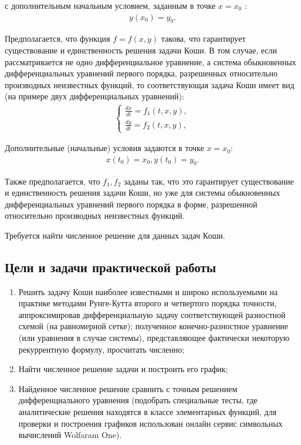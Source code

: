\documentclass[a4paper,12pt,titlepage,finall]{article}
\begin{document}
с дополнительным начальным условием, заданным в точке $x = x_0$ :
\begin{align*}
y(x_0)=y_0.
\end{align*}

Предполагается, что  функция $f = f (x, y)$ такова, что
гарантирует существование и единственность решения задачи Коши.
В том случае, если рассматривается не одно дифференциальное уравнение, а система обыкновенных дифференциальных уравнений первого порядка,
разрешенных
относительно
производных
неизвестных
функций, то
соответствующая задача Коши имеет вид (на примере двух дифференциальных
уравнений):
\begin{align*}
\begin{cases}
\frac{dx}{dt}=f_1(t,x,y),\\
\frac{dy}{dt}=f_2(t,x,y),
\end{cases}
\end{align*}
\par
Дополнительные (начальные) условия задаются в точке $x = x_0$:
\begin{align*}
x(t_0) = x_0, y(t_0)=y_0.
\end{align*}

Также предполагается, что $f_1, f_2$ заданы так, что это
гарантирует существование и единственность решения задачи Коши, но
уже для системы обыкновенных дифференциальных уравнений первого порядка в
форме, разрешенной относительно производных неизвестных функций.
\par
Требуется найти численное решение для данных задач Коши.

\subsection{Цели и задачи практической работы}
\begin{enumerate}
\item
Решить задачу Коши наиболее известными и широко
используемыми на практике методами Рунге-Кутта второго и четвертого
порядка
точности,
аппроксимировав
дифференциальную
задачу
соответствующей разностной схемой (на равномерной сетке); полученное
конечно-разностное уравнение (или уравнения в случае системы),
представляющее фактически некоторую рекуррентную формулу, просчитать
численно;
\item
Найти численное решение задачи и построить его график;
\item
Найденное численное решение сравнить с точным решением
дифференциального уравнения (подобрать специальные тесты, где
аналитические решения находятся в классе элементарных функций, для проверки и построения графиков использован онлайн сервис символьных вычислений Wolfaram One).

\end{enumerate}
\newpage
\end{document}
